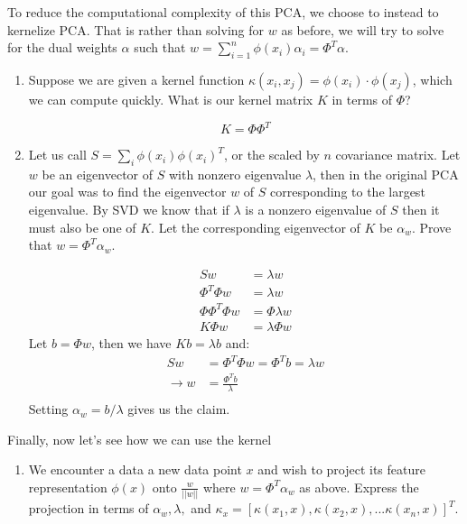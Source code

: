 \begin{Parts}
\item To reduce the computational complexity of this PCA, we choose to instead to kernelize PCA. That is rather than solving for $w$ as before, we will try to solve for the dual weights $\alpha$ such that $w = \sum_{i = 1}^{n} \phi(x_i)\alpha_i = \Phi^T\alpha$.
\begin{enumerate}
    \item Suppose we are given a kernel function $\kappa(x_i,x_j) = \phi(x_i) \cdot \phi(x_j)$, which we can compute quickly. What is our kernel matrix $K$ in terms of $\Phi$? 
    
\begin{solution}
    \begin{equation*}
        K = \Phi \Phi^T
    \end{equation*}
\end{solution}
    
    \item Let us call $S = \sum_i\phi(x_i)\phi(x_i)^T$, or the scaled by $n$ covariance matrix. Let $w$ be an eigenvector of $S$ with nonzero eigenvalue  $\lambda$, then in the original PCA our goal was to find the eigenvector $w$ of $S$ corresponding to the largest eigenvalue. By SVD we know that if $\lambda$ is a nonzero eigenvalue of $S$ then it must also be one of $K$. Let the corresponding eigenvector of $K$ be $\alpha_w$. Prove that $w = \Phi^T\alpha_w$.
    
\begin{solution}
    \begin{align*}
        Sw &=  \lambda{}w\\
        \Phi^T\Phi{}w &=  \lambda{}w\\
        \Phi\Phi^T\Phi w &= \Phi \lambda{} w \\
        K\Phi w &= \lambda \Phi w 
    \end{align*}
    Let $b = \Phi w$, then we have $Kb = \lambda b$ and:    
    \begin{align*}
        Sw &= \Phi^T\Phi w = \Phi^T b = \lambda w \\
        \longrightarrow{} w &= \frac{\Phi^T b}{\lambda} \\
    \end{align*}
    Setting $\alpha_w = b / \lambda$ gives us the claim.
\end{solution}
    
\end{enumerate}
\item Finally, now let's see how we can use the kernel
\begin{enumerate}
    \item We encounter a data a new data point $x$ and wish to project its feature representation $\phi(x)$ onto $\frac{w}{||w||}$ where $w = \Phi^T \alpha_w$ as above. Express the projection in terms of $\alpha_w, \lambda,$ and $\kappa_x = [\kappa(x_1, x), \kappa(x_2, x), ... \kappa(x_n, x)]^T$. 
    

\end{enumerate}
\end{Parts}
